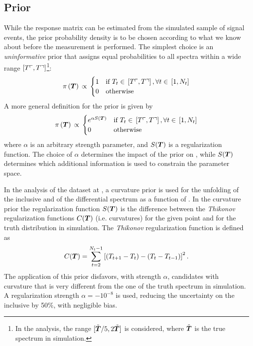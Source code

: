 \subsection{Prior}
\label{sec:fbuprior}
While the response matrix can be estimated from the simulated
sample of signal events, the prior probability density \prior{} is to
be chosen according to what we know about \Truth{} before the
measurement is performed.
The simplest choice is an {\it uninformative}
prior that assigns equal probabilities to all \Truth{} spectra within
a wide range $\left[T\ulcorner{}{}, T\urcorner{}{}\right]$\footnote{In the analysis,
the range $[\tilde{\boldsymbol{T}{}}/5, 2\tilde{\boldsymbol{T}}]$ is considered, where
$\tilde{\boldsymbol{T}{}}$ is the true spectrum in simulation.}:
\begin{equation}
\pi{}\left(\boldsymbol{T}{}\right){}
\propto{}
\begin{cases}
1 & \text{if }
T_{t}\in{}\left[T\ulcorner{}{}, T\urcorner{}{}\right], \forall{}t\in{}\left[1, N_t\right] \\
0 & \text{otherwise} \\
\end{cases}
\end{equation}
A more general definition for the prior is given by 
\begin{equation}
\pi{}\left(\boldsymbol{T}{}\right){}
\propto{}
\begin{cases}
e^{\alpha{}S(\boldsymbol{T}{})} & \text{if }
T_{t}\in{}\left[T\ulcorner{}{}, T\urcorner{}{}\right], \forall{}t\in{}\left[1, N_t\right] \\
0 & \text{otherwise} \\
\end{cases}
\end{equation}
where $\alpha{}$ is an arbitrary strength parameter, and
$S(\boldsymbol{T}{})$ is a regularization function.
The choice of $\alpha$ determines the impact of the prior on
\conditionalProb{\Truth{}}{\Data{}}, while $S(\boldsymbol{T}{})$ determines
which additional information is used to constrain the parameter
space.

In the analysis of the dataset at \seventev{}, a curvature prior is
used for the unfolding of the inclusive \ac{} and of the
differential \ac{} spectrum as a function of \pttt{}.
In the curvature prior the regularization function $S(\boldsymbol{T}{})$ is
the difference between the \emph{Thikonov} regularization functions
$C(\boldsymbol{T})$ (i.e. curvatures) for the given point \Truth{} and for the
truth distribution in simulation. 
The \emph{Thikonov} regularization function is defined as
\begin{equation}
        C(\boldsymbol{T}{}) =
        \sum_{t=2}^{N_t-1}\left[(T_{t+1}-T_{t})-(T_t-T_{t-1})\right]^2.
\end{equation}
The application of this prior disfavors, with strength $\alpha{}$,
\Truth{} candidates with curvature that is very different from
the one of the truth spectrum in simulation.
A regularization strength $\alpha{}=-10^{-8}$ is used, reducing the
uncertainty on the inclusive \ac{} by 50\%, with negligible bias.

